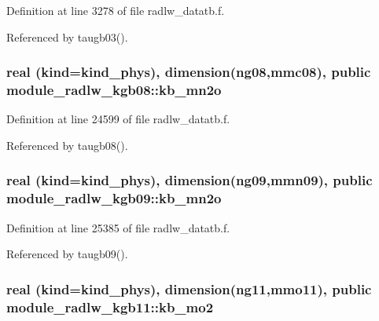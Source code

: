 Definition at line 3278 of file radlw\+\_\+datatb.\+f.



Referenced by taugb03().

\subsubsection[{\texorpdfstring{kb\+\_\+mn2o}{kb_mn2o}}]{\setlength{\rightskip}{0pt plus 5cm}real (kind=kind\+\_\+phys), dimension(ng08,mmc08), public module\+\_\+radlw\+\_\+kgb08\+::kb\+\_\+mn2o}\hypertarget{group__module__radlw__main_ga9a8e2f789421acc307e37b03478efb4b}{}\label{group__module__radlw__main_ga9a8e2f789421acc307e37b03478efb4b}


Definition at line 24599 of file radlw\+\_\+datatb.\+f.



Referenced by taugb08().

\subsubsection[{\texorpdfstring{kb\+\_\+mn2o}{kb_mn2o}}]{\setlength{\rightskip}{0pt plus 5cm}real (kind=kind\+\_\+phys), dimension(ng09,mmn09), public module\+\_\+radlw\+\_\+kgb09\+::kb\+\_\+mn2o}\hypertarget{group__module__radlw__main_ga79326139db789012d47c4750917c2cdb}{}\label{group__module__radlw__main_ga79326139db789012d47c4750917c2cdb}


Definition at line 25385 of file radlw\+\_\+datatb.\+f.



Referenced by taugb09().

\subsubsection[{\texorpdfstring{kb\+\_\+mo2}{kb_mo2}}]{\setlength{\rightskip}{0pt plus 5cm}real (kind=kind\+\_\+phys), dimension(ng11,mmo11), public module\+\_\+radlw\+\_\+kgb11\+::kb\+\_\+mo2}\hypertarget{group__module__radlw__main_gaebc48e152bb90794b6d0b426f6c5f9e4}{}\label{group__module__radlw__main_gaebc48e152bb90794b6d0b426f6c5f9e4}


